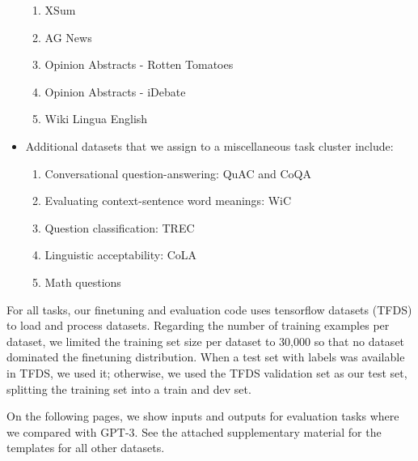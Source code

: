 \begin{itemize}[leftmargin=*]
\begin{enumerate}
        \item XSum \citep{narayan-etal-2018-dont}
        \item AG News \citep{NIPS2015_250cf8b5}
        \item Opinion Abstracts - Rotten Tomatoes \citep{wang-ling-2016-neural}
        \item Opinion Abstracts - iDebate \citep{wang-ling-2016-neural}
        \item Wiki Lingua English \citep{ladhak-etal-2020-wikilingua}
    \end{enumerate}
    \item Additional datasets that we assign to a miscellaneous task cluster include:
    \begin{enumerate}
        \item Conversational question-answering: QuAC \citep{choi-etal-2018-quac} and CoQA  \citep{reddy-etal-2019-coqa}
        \item Evaluating context-sentence word meanings: WiC \citep{pilehvar-camacho-collados-2019-wic}
        \item Question classification: TREC \citep{li-roth-2002-learning,hovy-etal-2001-toward}
        \item Linguistic acceptability: CoLA \citep{warstadt2018neural}
        \item Math questions \citep{saxton2019analysing}
    \end{enumerate}
\end{itemize}

For all tasks, our finetuning and evaluation code uses tensorflow datasets (TFDS) to load and process datasets.
Regarding the number of training examples per dataset, we limited the training set size per dataset to 30,000 so that no dataset dominated the finetuning distribution.  
When a test set with labels was available in TFDS, we used it; otherwise, we used the TFDS validation set as our test set, splitting the training set into a train and dev set.

On the following pages, we show inputs and outputs for evaluation tasks where we compared with GPT-3. See the attached supplementary material for the templates for all other datasets.

\newcommand{\taskio}[3]{
    \begin{table}[h]
        \centering
        \begin{tabular}{ |p{0.95\linewidth}| } 
             \hline
             \vspace{-1mm} \textsc{\textbf{\underline{Input}}}  \\ 
             #1 \\
             \hline
             \vspace{-1mm} \textsc{\textbf{\underline{Target}}}  \\ 
             {#2} \\
             \hline
        \end{tabular}
        \caption{#3}
    \end{table}
}

